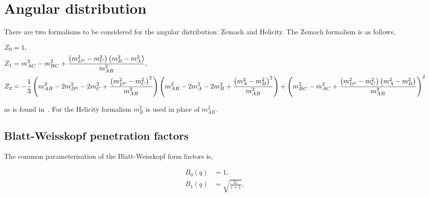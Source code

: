\section{Angular distribution}
\label{sec:angular}

There are two formalisms to be considered for the angular distribution: Zemach and Helicity.
The Zemach formalism is as follows,

\begin{align}
    Z_{0} & = 1, \\
    Z_{1} & = m_{AC}^{2} - m_{BC}^{2} + \frac{\left( m_{{{D}^0}}^{2} - m_{C}^{2} \right) \left( m_{B}^{2} - m_{A}^{2} \right)}{m^{2}_{AB}}, \\
    Z_{2} & = -\frac{1}{3} \left(  m_{AB}^{2} - 2m_{{{D}^0}}^{2} - 2m_{C}^{2} + \frac{\left( m_{{{D}^0}}^{2} - m_{C}^{2} \right)^{2}}{m_{AB}^{2}}  \right) 
    \left(  m_{AB}^{2} - 2m_{A}^{2} - 2m_{B}^{2} + \frac{\left( m_{A}^{2} - m_{B}^{2} \right)^{2}}{m_{AB}^{2}}  \right) + 
    \left( m_{BC}^{2} - m_{AC}^{2} + \frac{\left( m_{{{D}^0}}^{2} - m_{C}^{2} \right) \left( m_{A}^{2} - m_{B}^{2} \right)}{m^{2}_{AB}} \right)^{2}
\end{align}

as is found in~\cite{PhysRevLett:89:251802}. For the Helicity formalism $m_{R}^{2}$ is used in place of $m_{AB}^{2}$.
\subsection{Blatt-Weisskopf penetration factors}

The common parameterisation of the Blatt-Weisskopf form factors is,

\begin{align}
    B_{0}\left( q \right) & = 1, \\
    B_{1}\left( q \right) & = \sqrt{ \frac{2z}{z+1} }, \\
\end{align}
%
%
%

